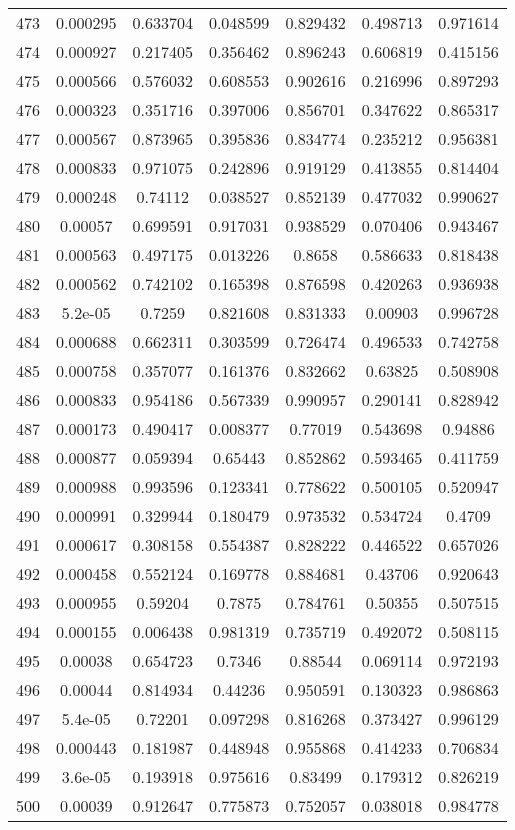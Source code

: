 \begin{table}
\begin{tabular}{c|c|c|c|c|c|c}
473 & 0.000295 & 0.633704 & 0.048599 & 0.829432 & 0.498713 & 0.971614\\
474 & 0.000927 & 0.217405 & 0.356462 & 0.896243 & 0.606819 & 0.415156\\
475 & 0.000566 & 0.576032 & 0.608553 & 0.902616 & 0.216996 & 0.897293\\
476 & 0.000323 & 0.351716 & 0.397006 & 0.856701 & 0.347622 & 0.865317\\
477 & 0.000567 & 0.873965 & 0.395836 & 0.834774 & 0.235212 & 0.956381\\
478 & 0.000833 & 0.971075 & 0.242896 & 0.919129 & 0.413855 & 0.814404\\
479 & 0.000248 & 0.74112 & 0.038527 & 0.852139 & 0.477032 & 0.990627\\
480 & 0.00057 & 0.699591 & 0.917031 & 0.938529 & 0.070406 & 0.943467\\
481 & 0.000563 & 0.497175 & 0.013226 & 0.8658 & 0.586633 & 0.818438\\
482 & 0.000562 & 0.742102 & 0.165398 & 0.876598 & 0.420263 & 0.936938\\
483 & 5.2e-05 & 0.7259 & 0.821608 & 0.831333 & 0.00903 & 0.996728\\
484 & 0.000688 & 0.662311 & 0.303599 & 0.726474 & 0.496533 & 0.742758\\
485 & 0.000758 & 0.357077 & 0.161376 & 0.832662 & 0.63825 & 0.508908\\
486 & 0.000833 & 0.954186 & 0.567339 & 0.990957 & 0.290141 & 0.828942\\
487 & 0.000173 & 0.490417 & 0.008377 & 0.77019 & 0.543698 & 0.94886\\
488 & 0.000877 & 0.059394 & 0.65443 & 0.852862 & 0.593465 & 0.411759\\
489 & 0.000988 & 0.993596 & 0.123341 & 0.778622 & 0.500105 & 0.520947\\
490 & 0.000991 & 0.329944 & 0.180479 & 0.973532 & 0.534724 & 0.4709\\
491 & 0.000617 & 0.308158 & 0.554387 & 0.828222 & 0.446522 & 0.657026\\
492 & 0.000458 & 0.552124 & 0.169778 & 0.884681 & 0.43706 & 0.920643\\
493 & 0.000955 & 0.59204 & 0.7875 & 0.784761 & 0.50355 & 0.507515\\
494 & 0.000155 & 0.006438 & 0.981319 & 0.735719 & 0.492072 & 0.508115\\
495 & 0.00038 & 0.654723 & 0.7346 & 0.88544 & 0.069114 & 0.972193\\
496 & 0.00044 & 0.814934 & 0.44236 & 0.950591 & 0.130323 & 0.986863\\
497 & 5.4e-05 & 0.72201 & 0.097298 & 0.816268 & 0.373427 & 0.996129\\
498 & 0.000443 & 0.181987 & 0.448948 & 0.955868 & 0.414233 & 0.706834\\
499 & 3.6e-05 & 0.193918 & 0.975616 & 0.83499 & 0.179312 & 0.826219\\
500 & 0.00039 & 0.912647 & 0.775873 & 0.752057 & 0.038018 & 0.984778\\
\end{tabular}
\end{table}
